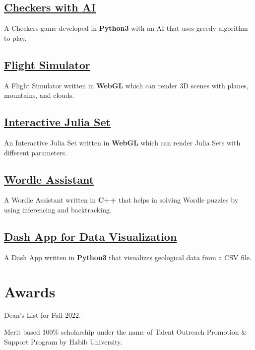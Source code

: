 \documentclass[]{resume}
\begin{document}
\begin{minipage}[t]{0.5\textwidth}
    \subsection{\href{https://github.com/Qazalbash/Checkers-with-AI}{\textbf{Checkers with AI}}}%
    A Checkers game developed in \textbf{Python3} with an AI that uses greedy algorithm to play.

    \subsection{\href{https://github.com/Qazalbash/Flight-Simulator-in-WebGL}{\textbf{Flight Simulator}}}
    A Flight Simulator written in \textbf{WebGL} which can render 3D scenes with planes, mountains, and clouds.

    \subsection{\href{https://github.com/Qazalbash/Interactive-Julia-Set}{\textbf{Interactive Julia Set}}}
    An Interactive Julia Set written in \textbf{WebGL} which can render Julia Sets with different parameters.

    \subsection{\href{https://github.com/Qazalbash/Wordle-Assistant}{\textbf{Wordle Assistant}}}%
    A Wordle Assistant written in \textbf{C++} that helps in solving Wordle puzzles by using inferencing and backtracking.

    \subsection{\href{https://github.com/Qazalbash/Dash-App-for-Data-Visualization}{
            \textbf{Dash App for Data Visualization}}}%
    A Dash App written in \textbf{Python3} that visualizes geological data from a CSV file.

    \section{Awards}
    \sectionsep
    \begin{tightemize}
        \item Dean's List for Fall 2022.
        \item Merit based 100\% scholarship under the name of Talent Outreach Promotion \& Support Program by Habib University.
    \end{tightemize}


\end{minipage}
\end{document}
